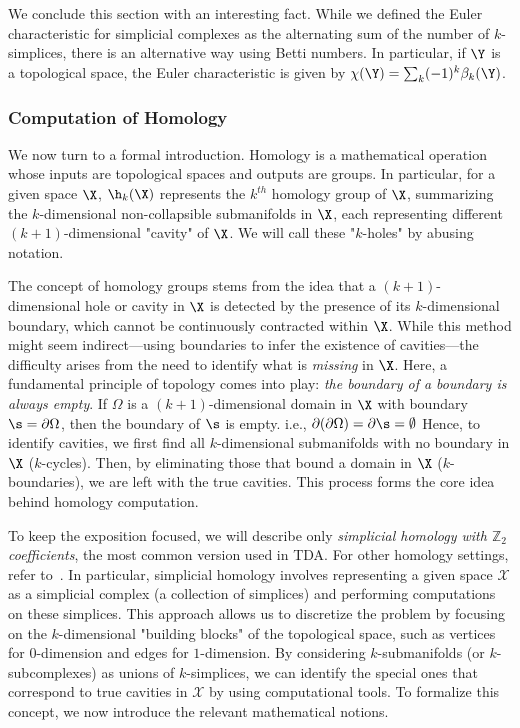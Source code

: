   

We conclude this section with an interesting fact. While we defined the Euler characteristic for simplicial complexes as the alternating sum of the number of $k$-simplices, there is an alternative way using Betti numbers. In particular, if $\Y$ is a topological space, the Euler characteristic is given by $\chi(\Y)=\sum_k(-1)^k\beta_k(\Y)$.
 

\subsubsection{Computation of Homology} \label{sec:homology2}
We now turn to a formal introduction. Homology is a mathematical operation whose inputs are topological spaces and outputs are groups. In particular, for a given space $\X$, $\h_k(\X)$ represents the $k^{th}$ homology group of $\X$, summarizing the $k$-dimensional non-collapsible submanifolds in $\X$, each representing different $(k+1)$-dimensional "cavity" of $\X$. We will call these "$k$-holes" by abusing notation. 

The concept of homology groups stems from the idea that a $(k+1)$-dimensional hole or cavity in $\X$ is detected by the presence of its $k$-dimensional boundary, which cannot be continuously contracted within $\X$. While this method might seem indirect—using boundaries to infer the existence of cavities—the difficulty arises from the need to identify what is \textit{missing} in $\X$. Here, a fundamental principle of topology comes into play: \textit{the boundary of a boundary is always empty}. If $\Omega$ is a $(k+1)$-dimensional domain in $\X$ with boundary $\s = \partial \Omega$, then the boundary of $\s$ is empty. i.e., $\partial(\partial \Omega) = \partial \s=\emptyset$ Hence, to identify cavities, we first find all $k$-dimensional submanifolds with no boundary in $\X$ ($k$-cycles). Then, by eliminating those that bound a domain in $\X$ ($k$-boundaries), we are left with the true cavities. This process forms the core idea behind homology computation.


To keep the exposition focused, we will describe only \textit{simplicial homology with $\mathbb{Z}_2$ coefficients}, the most common version used in TDA. For other homology settings, refer to~\cite{hatcher2002algebraic}. In particular, simplicial homology involves representing a given space $\mathcal{X}$ as a simplicial complex (a collection of simplices) and performing computations on these simplices. This approach allows us to discretize the problem by focusing on the $k$-dimensional "building blocks" of the topological space, such as vertices for $0$-dimension and edges for $1$-dimension. By considering $k$-submanifolds  (or $k$-subcomplexes) as unions of $k$-simplices, we can identify the special ones that correspond to true cavities in $\mathcal{X}$ by using computational tools. To formalize this concept, we now introduce the relevant mathematical notions.


